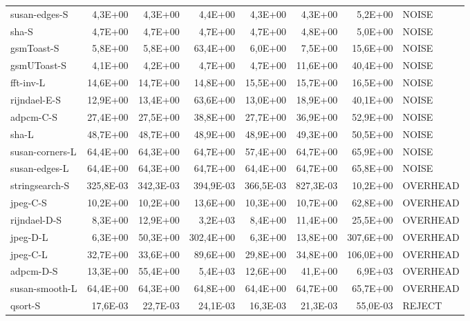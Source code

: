 \begin{table}[ht!]
\begin{adjustwidth}{-40pt}{0pt}
\begin{tabular}{@{}lrrrrrrl@{}}
			susan-edges-S       & 4,3E+00   & 4,3E+00   & 4,4E+00   & 4,3E+00   & 4,3E+00   & 5,2E+00   & NOISE    \\
			sha-S               & 4,7E+00   & 4,7E+00   & 4,7E+00   & 4,7E+00   & 4,8E+00   & 5,0E+00   & NOISE    \\
			gsmToast-S          & 5,8E+00   & 5,8E+00   & 63,4E+00  & 6,0E+00   & 7,5E+00   & 15,6E+00  & NOISE    \\
			gsmUToast-S         & 4,1E+00   & 4,2E+00   & 4,7E+00   & 4,7E+00   & 11,6E+00  & 40,4E+00  & NOISE    \\
			fft-inv-L           & 14,6E+00  & 14,7E+00  & 14,8E+00  & 15,5E+00  & 15,7E+00  & 16,5E+00  & NOISE    \\
			rijndael-E-S        & 12,9E+00  & 13,4E+00  & 63,6E+00  & 13,0E+00  & 18,9E+00  & 40,1E+00  & NOISE    \\
			adpcm-C-S           & 27,4E+00  & 27,5E+00  & 38,8E+00  & 27,7E+00  & 36,9E+00  & 52,9E+00  & NOISE    \\
			sha-L               & 48,7E+00  & 48,7E+00  & 48,9E+00  & 48,9E+00  & 49,3E+00  & 50,5E+00  & NOISE    \\
			susan-corners-L     & 64,4E+00  & 64,3E+00  & 64,7E+00  & 57,4E+00  & 64,7E+00  & 65,9E+00  & NOISE    \\
			susan-edges-L       & 64,4E+00  & 64,3E+00  & 64,7E+00  & 64,4E+00  & 64,7E+00  & 65,8E+00  & NOISE    \\
			stringsearch-S 		& 325,8E-03 & 342,3E-03 & 394,9E-03 & 366,5E-03 & 827,3E-03 & 10,2E+00  & OVERHEAD \\
			jpeg-C-S            & 10,2E+00  & 10,2E+00  & 13,6E+00  & 10,3E+00  & 10,7E+00  & 62,8E+00  & OVERHEAD \\
			rijndael-D-S        & 8,3E+00   & 12,9E+00  & 3,2E+03   & 8,4E+00   & 11,4E+00  & 25,5E+00  & OVERHEAD \\
			jpeg-D-L            & 6,3E+00   & 50,3E+00  & 302,4E+00 & 6,3E+00   & 13,8E+00  & 307,6E+00 & OVERHEAD \\
			jpeg-C-L            & 32,7E+00  & 33,6E+00  & 89,6E+00  & 29,8E+00  & 34,8E+00  & 106,0E+00 & OVERHEAD \\
			adpcm-D-S           & 13,3E+00  & 55,4E+00  & 5,4E+03   & 12,6E+00  & 41,E+00   & 6,9E+03   & OVERHEAD \\
			susan-smooth-L      & 64,4E+00  & 64,3E+00  & 64,8E+00  & 64,4E+00  & 64,7E+00  & 65,7E+00  & OVERHEAD \\
			qsort-S             & 17,6E-03  & 22,7E-03  & 24,1E-03  & 16,3E-03  & 21,3E-03  & 55,0E-03  & REJECT   \\

\end{tabular}
\end{adjustwidth}
\end{table}
